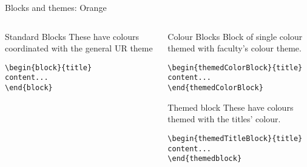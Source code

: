 \begingroup
{}
\begin{frame}[fragile]{Blocks and themes: Orange}
\begin{columns} %
\begin{column}{0.3\textwidth}
\begin{block}{Standard Blocks}
These have colours coordinated with the general UR theme
\begin{verbatim}
\begin{block}{title}
content...
\end{block}
\end{verbatim}
\end{block}
\end{column}
\begin{column}{0.7\textwidth}
\begin{themedColorBlock}{Colour Blocks}
Block of single colour themed with faculty's colour theme.
\small
\begin{verbatim}
\begin{themedColorBlock}{title}
content...
\end{themedColorBlock}
\end{verbatim}
\end{themedColorBlock}
\begin{themedTitleBlock} {Themed block}
These have colours themed with the titles' colour.
\small
\begin{verbatim}
\begin{themedTitleBlock}{title}
content...
\end{themedblock}
\end{verbatim}
\end{themedTitleBlock}
\end{column}
\end{columns}
\end{frame}
\endgroup


